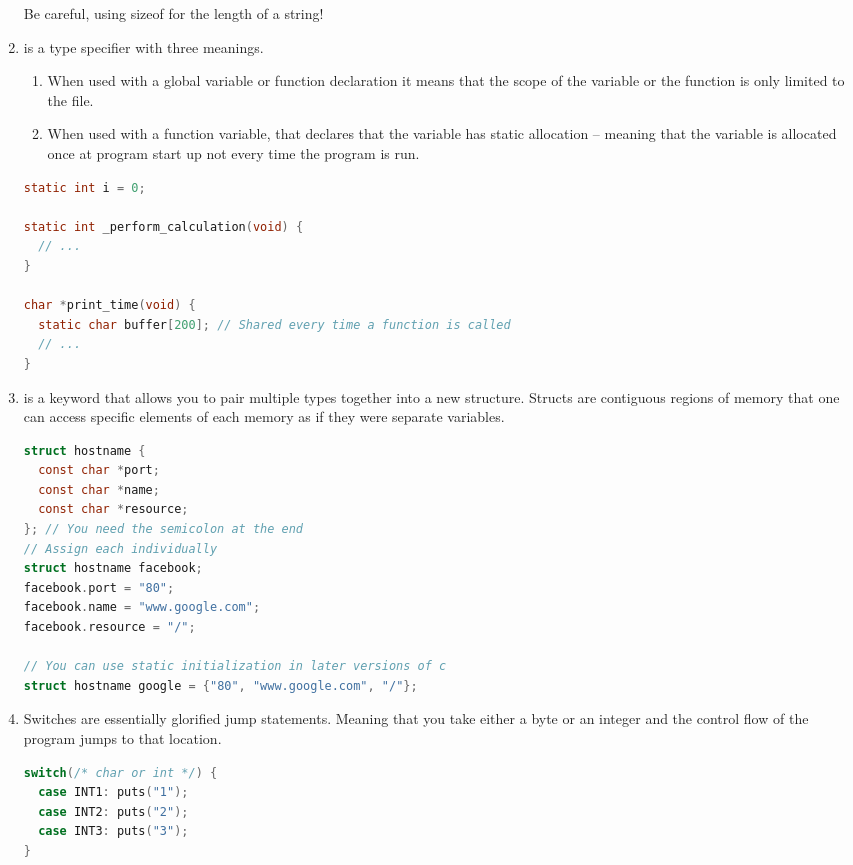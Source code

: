 \begin{enumerate}
	      Be careful, using sizeof for the length of a string!

	\item {} is a type specifier with three meanings.

	      \begin{enumerate}
		      \item When used with a global variable or function declaration it means that the scope of the variable or the function is only limited to the file.
		      \item When used with a function variable, that declares that the variable has static allocation -- meaning that the variable is allocated once at program start up not every time the program is run.
	      \end{enumerate}

	      \begin{lstlisting}[language=C]
static int i = 0;

static int _perform_calculation(void) {
  // ...
}

char *print_time(void) {
  static char buffer[200]; // Shared every time a function is called
  // ...
}
\end{lstlisting}

	\item {} is a keyword that allows you to pair multiple types together into a new structure. Structs are contiguous regions of memory that one can access specific elements of each memory as if they were separate variables.

	      \begin{lstlisting}[language=C]
struct hostname {
  const char *port;
  const char *name;
  const char *resource;
}; // You need the semicolon at the end
// Assign each individually
struct hostname facebook;
facebook.port = "80";
facebook.name = "www.google.com";
facebook.resource = "/";

// You can use static initialization in later versions of c
struct hostname google = {"80", "www.google.com", "/"};
\end{lstlisting}


	\item {} Switches are essentially glorified jump statements. Meaning that you take either a byte or an integer and the control flow of the program jumps to that location.
	      \\
	      \begin{lstlisting}[language=C]
switch(/* char or int */) {
  case INT1: puts("1");
  case INT2: puts("2");
  case INT3: puts("3");
}
\end{lstlisting}


\end{enumerate}
